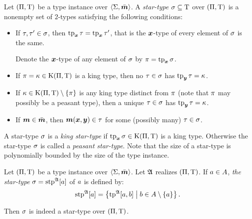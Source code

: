 \begin{definition}
Let $(\Pi,\mathrm{T})$ be a type instance over $\left\langle \mathrm{\Sigma},\bar{\bm{m}} \right\rangle$.
A \emph{star-type} $\sigma \subseteq \mathrm{T}$ over $(\Pi,\mathrm{T})$ is a nonempty
set of $2$-types satisfying the following conditions:
\begin{itemize}
  \item[\condstpx]\label{cond:stpx}
  If $\tau, {\tau'} \in \sigma$, then $\operatorname{tp}_{\bm{x}}\tau = \operatorname{tp}_{\bm{x}}{\tau'}$, that is the
  $\bm{x}$-type of every element of $\sigma$ is the same.

  Denote the $\bm{x}$-type of any element of $\sigma$ by $\pi = \operatorname{tp}_{\bm{x}}\sigma$.
  \item[\condstpkx]\label{cond:stpkx}
  If $\pi = \kappa \in \mathrm{K}(\Pi,\mathrm{T})$ is a king type, then no
  $\tau\in\sigma$ has $\operatorname{tp}_{\bm{y}}\tau = \kappa$.
  \item[\condstpky]\label{cond:stpky}
  If $\kappa \in \mathrm{K}(\Pi,\mathrm{T}) \setminus \left\{\pi\right\}$ is any king type distinct
  from $\pi$ (note that $\pi$ may possibly be a peasant type), then
  a unique $\tau\in\sigma$ has $\operatorname{tp}_{\bm{y}}\tau = \kappa$.
  \item[\condstpm]\label{cond:stpm} If $\bm{m} \in \bar{\bm{m}}$, then $\bm{m}(\bm{x},\bm{y})
  \in \tau$ for some (possibly many) $\tau \in \sigma$.
\end{itemize}
A star-type $\sigma$ is a \emph{king star-type} if $\operatorname{tp}_{\bm{x}}\sigma \in
\mathrm{K}(\Pi,\mathrm{T})$ is a king type. 
Otherwise the star-type $\sigma$ is called a \emph{peasant star-type}.
Note that the size of a star-type is polynomially bounded by the size of the
type instance.
\end{definition}
\begin{definition}\label{def:stp-str}
Let $(\Pi,\mathrm{T})$ be a type instance over $\left\langle \mathrm{\Sigma},\bar{\bm{m}} \right\rangle$.
Let $\mathfrak{A}$ realizes $(\Pi,\mathrm{T})$.
If $a \in A$, \emph{the star-type} $\sigma = \operatorname{stp}^{\mathfrak{A}}[a]$ of $a$ is
defined by:
\[
  \operatorname{stp}^{\mathfrak{A}}[a] = \left\{\operatorname{tp}^{\mathfrak{A}}[a,b]\mathrel{}\middle|\mathrel{}b \in A \setminus \left\{a\right\}\right\}.
\]
\end{definition}
\begin{remark}\label{rem:stp-str}
Then $\sigma$ is indeed a star-type over $(\Pi,\mathrm{T})$.
\end{remark}
